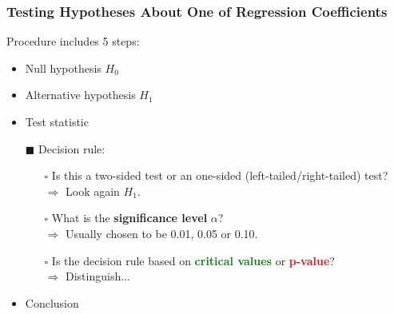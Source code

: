 \documentclass[11pt, xcolor=x11names,compress]{beamer}
\begin{document}
\begin{frame}[fragile,t]
\linespread{1.15}
\frametitle{Testing Hypotheses About One
of Regression Coefficients}

Procedure includes 5 steps:
\begin{itemize}
    \item Null hypothesis $H_0$
    \item Alternative hypothesis $H_1$
    \item Test statistic
    \item [$\blacksquare$] Decision rule:
    \begin{itemize}
        \item [$\square$] Is this a two-sided test or an one-sided (left-tailed/right-tailed) test?\\
        $\Longrightarrow$ Look again $H_1$.
        \item [$\square$] What is the \textbf{significance level} $\alpha$?\\
        $\Longrightarrow$ Usually chosen to be 0.01, 0.05 or 0.10.
        \item [$\square$] Is the decision rule based on \textcolor{green}{\textbf{critical values}} or \textcolor{red}{\textbf{p-value}}?\\
        $\Longrightarrow$ Distinguish...
    \end{itemize}
    \item Conclusion
\end{itemize}

\end{frame}
\end{document}
